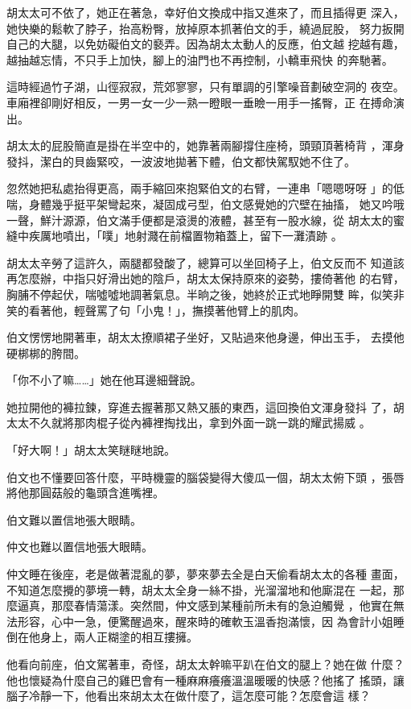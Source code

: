 胡太太可不依了，她正在著急，幸好伯文換成中指又進來了，而且插得更
深入，她快樂的鬆軟了脖子，抬高粉臀，放掉原本抓著伯文的手，繞過屁股，
努力扳開自己的大腿，以免妨礙伯文的褻弄。因為胡太太動人的反應，伯文越
挖越有趣，越抽越忘情，不只手上加快，腳上的油門也不再控制，小轎車飛快
的奔馳著。

這時經過竹子湖，山徑寂寂，荒郊寥寥，只有單調的引擎噪音劃破空洞的
夜空。車廂裡卻剛好相反，一男一女一少一熟一瞪眼一垂瞼一用手一搖臀，正
在搏命演出。

胡太太的屁股簡直是掛在半空中的，她靠著兩腳撐住座椅，頭頸頂著椅背
，渾身發抖，潔白的貝齒緊咬，一波波地拋著下體，伯文都快駕馭她不住了。

忽然她把私處抬得更高，兩手縮回來抱緊伯文的右臂，一連串「嗯嗯呀呀
」的低喘，身體幾乎挺平架彎起來，凝固成弓型，伯文感覺她的穴壁在抽搐，
她又吟哦一聲，鮮汁源源，伯文滿手便都是滾燙的液體，甚至有一股水線，從
胡太太的蜜縫中疾厲地噴出，「噗」地射濺在前檔置物箱蓋上，留下一灘漬跡
。

胡太太辛勞了這許久，兩腿都發酸了，總算可以坐回椅子上，伯文反而不
知道該再怎麼辦，中指只好滑出她的陰戶，胡太太保持原來的姿勢，摟倚著他
的右臂，胸脯不停起伏，喘噓噓地調著氣息。半晌之後，她終於正式地睜開雙
眸，似笑非笑的看著他，輕聲罵了句「小鬼！」，撫摸著他臂上的肌肉。

伯文愣愣地開著車，胡太太撩順裙子坐好，又貼過來他身邊，伸出玉手，
去摸他硬梆梆的胯間。

「你不小了嘛……」她在他耳邊細聲說。

她拉開他的褲拉鍊，穿進去握著那又熱又脹的東西，這回換伯文渾身發抖
了，胡太太不久就將那肉棍子從內褲裡掏找出，拿到外面一跳一跳的耀武揚威
。

「好大啊！」胡太太笑瞇瞇地說。

伯文也不懂要回答什麼，平時機靈的腦袋變得大傻瓜一個，胡太太俯下頭
，張唇將他那圓菇般的龜頭含進嘴裡。

伯文難以置信地張大眼睛。

仲文也難以置信地張大眼睛。

仲文睡在後座，老是做著混亂的夢，夢來夢去全是白天偷看胡太太的各種
畫面，不知道怎麼攪的夢境一轉，胡太太全身一絲不掛，光溜溜地和他廝混在
一起，那麼逼真，那麼春情蕩漾。突然間，仲文感到某種前所未有的急迫觸覺
，他實在無法形容，心中一急，便驚醒過來，醒來時的確軟玉溫香抱滿懷，因
為會計小姐睡倒在他身上，兩人正糊塗的相互摟擁。

他看向前座，伯文駕著車，奇怪，胡太太幹嘛平趴在伯文的腿上？她在做
什麼？他也懷疑為什麼自己的雞巴會有一種麻麻癢癢溫溫暖暖的快感？他搖了
搖頭，讓腦子冷靜一下，他看出來胡太太在做什麼了，這怎麼可能？怎麼會這
樣？

